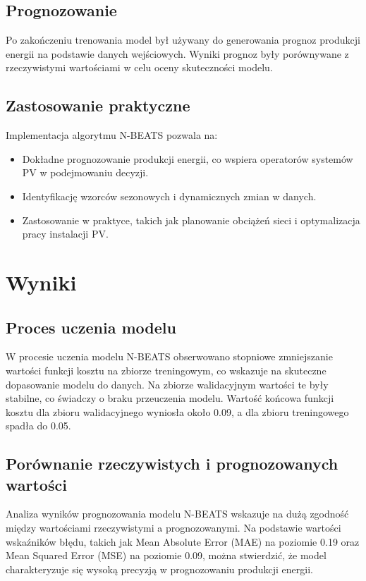 \documentclass[a4paper,fleqn,final]{cas-dc}\usepackage[authoryear,longnamesfirst]{natbib}
\begin{document}
\subsection{Prognozowanie}
Po zakończeniu trenowania model był używany do generowania prognoz produkcji energii na podstawie danych wejściowych. Wyniki prognoz były porównywane z rzeczywistymi wartościami w celu oceny skuteczności modelu.

\subsection{Zastosowanie praktyczne}
Implementacja algorytmu N-BEATS pozwala na:
\begin{itemize}
    \item Dokładne prognozowanie produkcji energii, co wspiera operatorów systemów PV w podejmowaniu decyzji.
    \item Identyfikację wzorców sezonowych i dynamicznych zmian w danych.
    \item Zastosowanie w praktyce, takich jak planowanie obciążeń sieci i optymalizacja pracy instalacji PV.
\end{itemize}

\section{Wyniki}

\subsection{Proces uczenia modelu}
W procesie uczenia modelu N-BEATS obserwowano stopniowe zmniejszanie wartości funkcji kosztu na zbiorze treningowym, co wskazuje na skuteczne dopasowanie modelu do danych. Na zbiorze walidacyjnym wartości te były stabilne, co świadczy o braku przeuczenia modelu. Wartość końcowa funkcji kosztu dla zbioru walidacyjnego wyniosła około 0.09, a dla zbioru treningowego spadła do 0.05.

\subsection{Porównanie rzeczywistych i prognozowanych wartości}
Analiza wyników prognozowania modelu N-BEATS wskazuje na dużą zgodność między wartościami rzeczywistymi a prognozowanymi. Na podstawie wartości wskaźników błędu, takich jak Mean Absolute Error (MAE) na poziomie 0.19 oraz Mean Squared Error (MSE) na poziomie 0.09, można stwierdzić, że model charakteryzuje się wysoką precyzją w prognozowaniu produkcji energii. 
\end{document}
